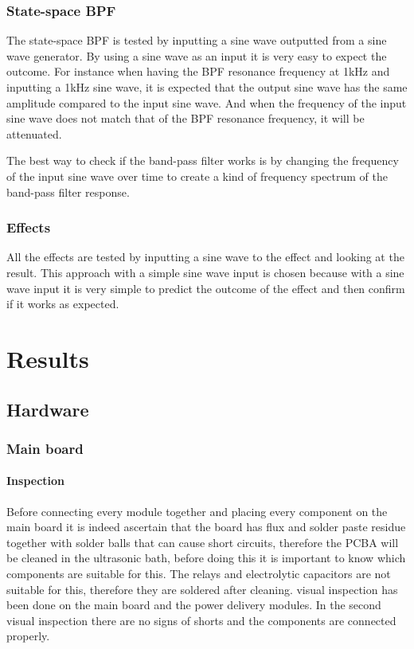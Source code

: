 \subsubsection{State-space BPF}
The state-space BPF is tested by inputting a sine wave outputted from a sine wave generator. By using a sine wave as an input it is very easy to expect the outcome. For instance when having the BPF resonance frequency at 1kHz and inputting a 1kHz sine wave, it is expected that the output sine wave has the same amplitude compared to the input sine wave. And when the frequency of the input sine wave does not match that of the BPF resonance frequency, it will be attenuated. 

The best way to check if the band-pass filter works is by changing the frequency of the input sine wave over time to create a kind of frequency spectrum of the band-pass filter response. 

\subsubsection{Effects}
All the effects are tested by inputting a sine wave to the effect and looking at the result. This approach with a simple sine wave input is chosen because with a sine wave input it is very simple to predict the outcome of the effect and then confirm if it works as expected.

\section{Results}

\subsection{Hardware}

\subsubsection{Main board}
\paragraph{Inspection} Before connecting every module together and placing every component on the main board it is indeed ascertain that the board has flux and solder paste residue together with solder balls that can cause short circuits, therefore the PCBA will be cleaned in the ultrasonic bath, before doing this it is important to know which components are suitable for this. The relays and electrolytic capacitors are not suitable for this, therefore they are soldered after cleaning.  visual inspection has been done on the main board and the power delivery modules. In the second visual inspection there are no signs of shorts and the components are connected properly.
